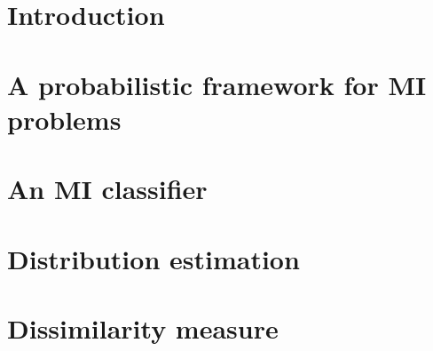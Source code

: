 \documentclass[preprint,12pt]{elsarticle}
\begin{document}
\newcommand{\cpos}{\text{\scriptsize{{\it POS}}}}
\newcommand{\cneg}{\text{\scriptsize{{\it NEG}}}}


\begin{frontmatter}







\end{frontmatter}

\clearpage

\section{Introduction} \label{sec:Introduction} 


\section{A probabilistic framework for MI problems} \label{sec:Probabilistic} 


% 

% 

\section{An MI classifier} \label{sec:Classifier}


\section{Distribution estimation} \label{sec:Distribution}


\section{Dissimilarity measure} \label{sec:Dissimilarity}


% 
\end{document}
